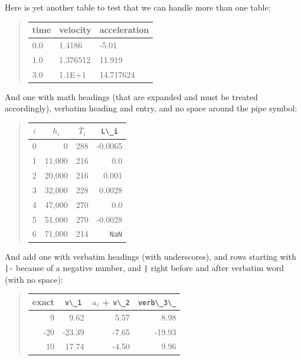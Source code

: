 \documentclass[%
oneside,                 %
final,                   %
10pt]{article}
\theoremstyle{definition}
\begin{document}
\begin{enumerate}
Here is yet another table to test that we can handle more than
one table:
\begin{quote}
\begin{tabular}{lll}
\hline
\multicolumn{1}{l}{ time } & \multicolumn{1}{l}{ velocity } & \multicolumn{1}{l}{ acceleration } \\
\hline
0.0  & 1.4186   & -5.01        \\
1.0  & 1.376512 & 11.919       \\
3.0  & 1.1E+1   & 14.717624    \\
\hline
\end{tabular}
\end{quote}
\noindent
And one with math headings (that are expanded and must be treated
accordingly), verbatim heading and entry, and no space around the pipe
symbol:
\begin{quote}
\begin{tabular}{lrrr}
\hline
\multicolumn{1}{c}{ $i$ } & \multicolumn{1}{c}{ $h_i$ } & \multicolumn{1}{c}{ $\bar T_i$ } & \multicolumn{1}{c}{ \Verb!L\_i! } \\
\hline
0   & 0      & 288        & -0.0065    \\
1   & 11,000 & 216        & 0.0        \\
2   & 20,000 & 216        & 0.001      \\
3   & 32,000 & 228        & 0.0028     \\
4   & 47,000 & 270        & 0.0        \\
5   & 51,000 & 270        & -0.0028    \\
6   & 71,000 & 214        & \texttt{NaN} \\
\hline
\end{tabular}
\end{quote}
\noindent
And add one with verbatim headings (with underscores),
and rows starting with \texttt{|-} because of a negative number,
and \texttt{|} right before and after verbatim word (with no space):
\begin{quote}
\begin{tabular}{rrrr}
\hline
\multicolumn{1}{c}{ exact } & \multicolumn{1}{c}{ \Verb!v\_1! } & \multicolumn{1}{c}{ $a_i$ + \Verb!v\_2! } & \multicolumn{1}{c}{ \Verb!verb\_3\_! } \\
\hline
9     & 9.62       & 5.57               & 8.98           \\
-20   & -23.39     & -7.65              & -19.93         \\
10    & 17.74      & -4.50              & 9.96           \\

\end{tabular}
\end{quote}
\end{enumerate}
\end{document}
